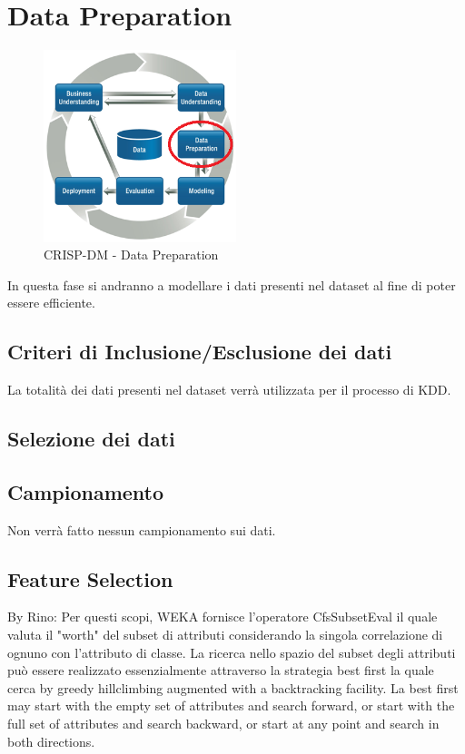 \chapter{Data Preparation}

\begin{figure}[hbtp]
	\centering
	\includegraphics[width=0.5\textwidth]{./images/CRISPDM_3.png}
	\caption{CRISP-DM - Data Preparation}
	\label{CRISPDM_3}
\end{figure}

In questa fase si andranno a modellare i dati presenti nel dataset al fine di poter essere efficiente.

\section{Criteri di Inclusione/Esclusione dei dati}

La totalità dei dati presenti nel dataset verrà utilizzata per il processo di KDD.

\section{Selezione dei dati}


\section{Campionamento}

Non verrà fatto nessun campionamento sui dati.

\section{Feature Selection}
By Rino:
Per questi scopi, WEKA fornisce l'operatore CfsSubsetEval il quale valuta il "worth" del subset di attributi considerando la singola correlazione di ognuno con l'attributo di classe. La ricerca nello spazio del subset degli attributi può essere realizzato essenzialmente attraverso la strategia best first la quale cerca by greedy hillclimbing augmented with a backtracking facility.
La best first may start with the empty set of attributes and search forward, or start with the full set of attributes and search backward, or start at any point and search in both directions.


